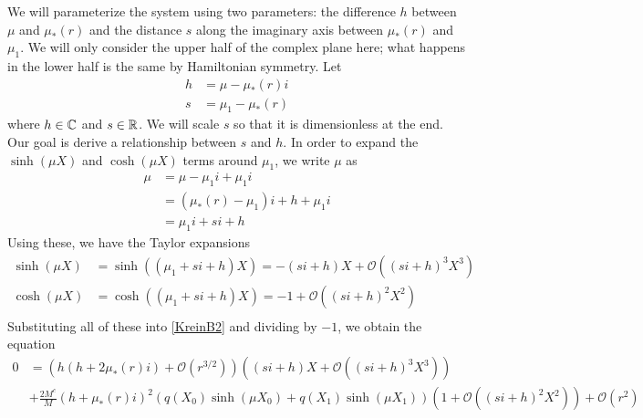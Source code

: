 \documentclass[thesis.tex]{subfiles}
\begin{document}
We will parameterize the system using two parameters: the difference $h$ between $\mu$ and $\mu_*(r)$ and the distance $s$ along the imaginary axis between $\mu_*(r)$ and $\mu_1$. We will only consider the upper half of the complex plane here; what happens in the lower half is the same by Hamiltonian symmetry. Let 
\begin{align*}
h &= \mu - \mu_*(r) i \\
s &= \mu_1 - \mu_*(r)
\end{align*}
where $h \in \mathbb{C}$ and $s \in \mathbb{R}$. We will scale $s$ so that it is dimensionless at the end. Our goal is derive a relationship between $s$ and $h$. In order to expand the $\sinh(\mu X)$ and $\cosh(\mu X)$ terms around $\mu_1$, we write $\mu$ as
\begin{align*}
\mu &= \mu - \mu_1 i + \mu_1 i \\
&= (\mu_*(r) - \mu_1)i + h + \mu_1 i \\
&= \mu_1 i + s i + h
\end{align*}
Using these, we have the Taylor expansions
\begin{align*}
\sinh(\mu X) &= \sinh((\mu_1 + s i + h)X)
= -(s i + h)X + \mathcal{O}\left( (s i +h)^3 X^3 \right) \\
\cosh(\mu X) &= \cosh((\mu_1 + s i + h)X)
= -1 + \mathcal{O}\left( (s i + h)^2 X^2 \right) \\
\end{align*}
Substituting all of these into \cref{KreinB2} and dividing by $-1$, we obtain the equation
\begin{equation}\label{KreinB3}
\begin{aligned}
0 &= \left( h ( h + 2 \mu_*(r) i) +  \mathcal{O}( r^{3/2} )\right) \left( (s i + h)X + \mathcal{O}\left( (si+h)^3 X^3 \right)  \right) \\
&+\frac{2 M^c}{M} ( h + \mu_*(r) i)^2 ( q(X_0)\sinh(\mu X_0) + q(X_1) \sinh(\mu X_1) ) \left( 1 + \mathcal{O}\left( (s i +h)^2 X^2 \right) \right) + \mathcal{O}( r^2 )
\end{aligned}
\end{equation}
\end{document}
